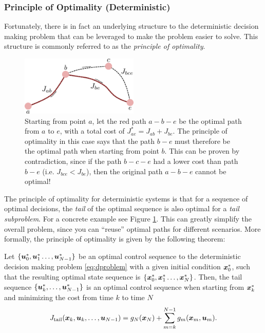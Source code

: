 \subsubsection{Principle of Optimality (Deterministic)}
Fortunately, there is in fact an underlying structure to the deterministic decision making problem that can be leveraged to make the problem easier to solve. This structure is commonly referred to as the \textit{principle of optimality}.
\begin{figure}[ht]
    \centering
    \includegraphics[width=0.5\textwidth]{tex/figs/ch20_figs/princopt1.png}
    \caption{Starting from point $a$, let the red path $a-b-e$ be the optimal path from $a$ to $e$, with a total cost of $J^*_{ae} = J_{ab}+J_{be}$. The principle of optimality in this case says that the path $b-e$ must therefore be the optimal path when starting from point $b$. This can be proven by contradiction, since if the path $b-c-e$ had a lower cost than path $b-e$ (i.e. $J_{bce} < J_{be}$), then the original path $a-b-e$ cannot be optimal!}
    \label{fig:princopt1}
\end{figure}

The principle of optimality for deterministic systems is that for a sequence of optimal decisions, the \textit{tail} of the optimal sequence is also optimal for a \textit{tail subproblem}. For a concrete example see Figure \ref{fig:princopt1}. This can greatly simplify the overall problem, since you can ``reuse'' optimal paths for different scenarios. More formally, the principle of optimality is given by the following theorem:
\begin{theorem}
Let $\{\bm{u}_0^*, \bm{u}_1^* \dots, \bm{u}_{N-1}^*\}$ be an optimal control sequence to the deterministic decision making problem \eqref{eq:dproblem} with a given initial condition $\bm{x}^*_0$, such that the resulting optimal state sequence is $\{\bm{x}_0^*, \bm{x}_1^* \dots, \bm{x}_{N}^*\}$. Then, the tail sequence $\{\bm{u}_k^*, \dots, \bm{u}_{N-1}^*\}$ is an optimal control sequence when starting from $\bm{x}^*_k$ and minimizing the cost from time $k$ to time $N$
\begin{equation*}
J_{\text{tail}}(\bm{x}_k, \bm{u}_k, \dots, \bm{u}_{N-1}) = g_N(\bm{x}_N) + \sum_{m=k}^{N-1} g_m(\bm{x}_m, \bm{u}_m).
\end{equation*}
\end{theorem}

